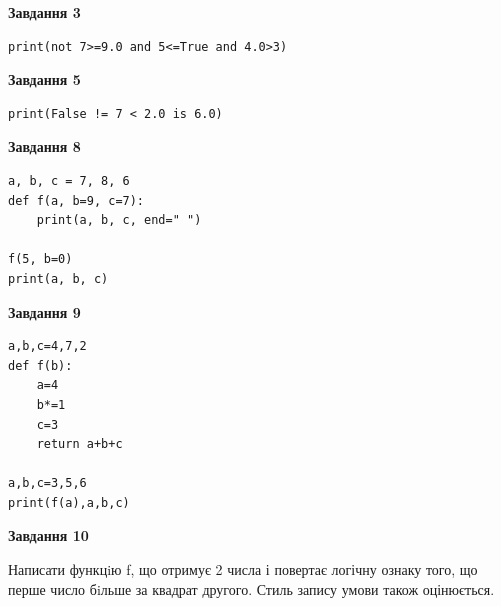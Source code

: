 \documentclass[12pt, ukrainian]{article}
\begin{document}
{\begin {large}
\begin{minipage}[t]{7.5cm}
\end{minipage}
\vline \hspace{6mm}
\begin{minipage}[t]{10.5cm}

\begin{center}
\textbf{Завдання 3}
\end{center}

\begin{verbatim}
print(not 7>=9.0 and 5<=True and 4.0>3)
\end{verbatim}



\begin{center}
\textbf{Завдання 5}
\end{center}

\begin{verbatim}
print(False != 7 < 2.0 is 6.0)
\end{verbatim}



\begin{center}
\textbf{Завдання 8}
\end{center}

\begin{verbatim}
a, b, c = 7, 8, 6
def f(a, b=9, c=7):
    print(a, b, c, end=" ")

f(5, b=0)
print(a, b, c)
\end{verbatim}



\begin{center}
\textbf{Завдання 9}
\end{center}

\begin{verbatim}
a,b,c=4,7,2
def f(b):
    a=4
    b*=1
    c=3
    return a+b+c

a,b,c=3,5,6
print(f(a),a,b,c)
\end{verbatim}



\begin{center}
\textbf{Завдання 10}
\end{center}

Написати функцiю f, що отримує 2 числа і повертає логічну ознаку того, що перше число бiльше за квадрат другого. Стиль запису умови також оцінюється.\par

\end{minipage}

\end {large}}
\newpage
\end{document}
